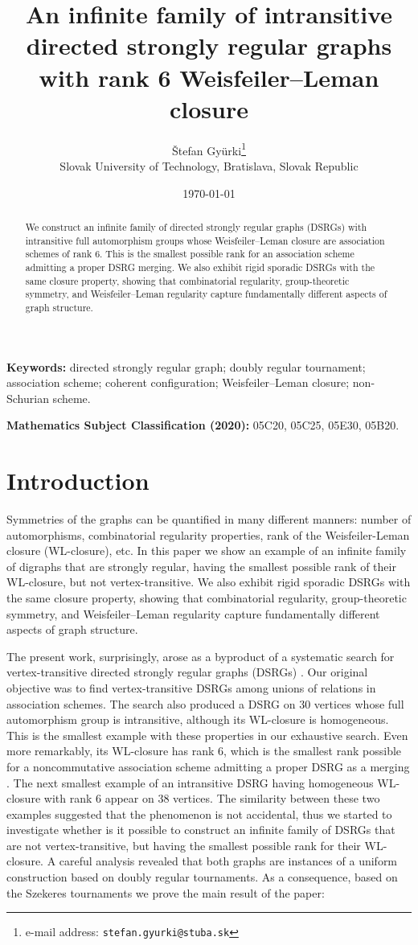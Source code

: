 \documentclass[11pt]{article}
\title{An infinite family of intransitive \\ directed strongly regular graphs\\
       with rank 6 Weisfeiler--Leman closure}
\author{\v{S}tefan Gy\"urki\footnote{e-mail address: {\tt stefan.gyurki@stuba.sk}}\\[0.1cm]
{\small Slovak University of Technology, Bratislava, Slovak Republic} }
\date{\today}
\theoremstyle{definition}
\theoremstyle{remark}
\begin{document}
\maketitle

\begin{abstract}
We construct an infinite family of directed strongly regular graphs (DSRGs)
with intransitive full automorphism groups whose Weisfeiler--Leman closure
are association schemes of rank 6.  This is the smallest
possible rank for an association scheme admitting a proper DSRG merging.
We also exhibit rigid sporadic DSRGs with the same closure property, showing
that combinatorial regularity, group-theoretic symmetry, and
Weisfeiler--Leman regularity capture fundamentally different aspects of
graph structure.
\end{abstract}

\medskip
\noindent\textbf{Keywords:}
directed strongly regular graph; doubly regular tournament; association
scheme; coherent configuration; Weisfeiler--Leman closure; non-Schurian
scheme.

\medskip
\noindent\textbf{Mathematics Subject Classification (2020):}
05C20, 05C25, 05E30, 05B20.

\section{Introduction}
\label{intro}
Symmetries of the graphs can be quantified in many different manners: number of automorphisms, combinatorial regularity properties, rank of the Weisfeiler-Leman closure (WL-closure), etc. 
In this paper we show an example of an infinite family of digraphs that are strongly regular, having the smallest possible rank of their WL-closure, but not vertex-transitive. 
We also exhibit rigid sporadic DSRGs with the same closure property, showing
that combinatorial regularity, group-theoretic symmetry, and
Weisfeiler--Leman regularity capture fundamentally different aspects of
graph structure.

The present work, surprisingly, arose as a byproduct of a systematic search for vertex-transitive directed strongly regular graphs (DSRGs) \cite{bg, gs}.  Our
original objective was to find vertex-transitive DSRGs among unions of relations in association schemes.  
The search also produced a DSRG
on $30$ vertices whose full automorphism group is intransitive, although its 
WL-closure is homogeneous.  This is the smallest example with these properties in our exhaustive search. Even more remarkably, its
WL-closure has rank 6, which is the smallest rank possible for a noncommutative association scheme admitting a proper DSRG as a merging
\cite{kmmz}.  
The next smallest example of an intransitive DSRG having homogeneous WL-closure with rank 6 appear on 38 vertices.  
The similarity between these two examples suggested that the phenomenon is
not accidental, thus we started to investigate whether is it possible to construct an infinite family of DSRGs that are not vertex-transitive, but having the 
smallest possible rank for their WL-closure. 
A careful analysis revealed that both graphs are instances
of a uniform construction based on doubly regular tournaments. As a consequence, based on the Szekeres tournaments we prove the main result of the paper:
\end{document}
